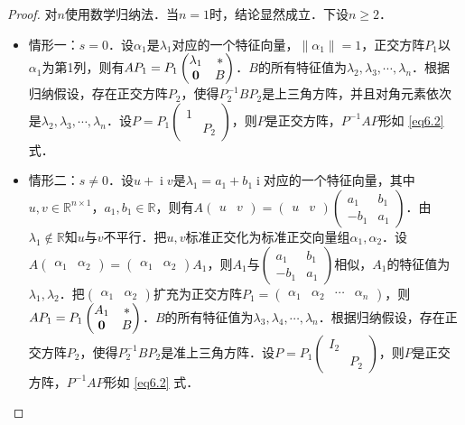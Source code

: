 \documentclass[a4paper,fontset=windows]{ctexbook}
\theoremstyle{definition}
\DeclareMathOperator{\I}{i}
\renewcommand{\ge}{\geqslant}
\begin{document}
\begin{proof}
对$n$使用数学归纳法．当$n=1$时，结论显然成立．下设$n\ge 2$．
\begin{itemize}
\item 情形一：$s=0$．设$\alpha_1$是$\lambda_1$对应的一个特征向量，$\|\alpha_1\|=1$，正交方阵$P_1$以$\alpha_1$为第1列，则有$AP_1=P_1\begin{pmatrix}\lambda_1&* \\ {\bf 0}&B\end{pmatrix}$．$B$的所有特征值为$\lambda_2,\lambda_3,\cdots,\lambda_n$．根据归纳假设，存在正交方阵$P_2$，使得$P_2^{-1}BP_2$是上三角方阵，并且对角元素依次是$\lambda_2,\lambda_3,\cdots,\lambda_n$．设$P=P_1\begin{pmatrix}1& \\ &P_2\end{pmatrix}$，则$P$是正交方阵，$P^{-1}AP$形如 \eqref{eq6.2} 式．

\item 情形二：$s\ne 0$．设$u+\I v$是$\lambda_1=a_1+b_1\I$对应的一个特征向量，其中$u,v\in\mathbb{R}^{n\times 1}$，$a_1,b_1\in\mathbb{R}$，则有$A\begin{pmatrix}u&v\end{pmatrix}=\begin{pmatrix}u&v\end{pmatrix}\begin{pmatrix}a_1&b_1 \\ -b_1&a_1\end{pmatrix}$．由$\lambda_1\notin\mathbb{R}$知$u$与$v$不平行．把$u,v$标准正交化为标准正交向量组$\alpha_1,\alpha_2$．设$A\begin{pmatrix}\alpha_1&\alpha_2\end{pmatrix}=\begin{pmatrix}\alpha_1&\alpha_2\end{pmatrix}A_1$，则$A_1$与$\begin{pmatrix}a_1&b_1 \\ -b_1&a_1\end{pmatrix}$相似，$A_1$的特征值为$\lambda_1,\lambda_2$．把$\begin{pmatrix}\alpha_1&\alpha_2\end{pmatrix}$扩充为正交方阵$P_1=\begin{pmatrix}\alpha_1&\alpha_2&\cdots&\alpha_n\end{pmatrix}$，则$AP_1=P_1\begin{pmatrix}A_1&* \\ {\bf 0}&B\end{pmatrix}$．$B$的所有特征值为$\lambda_3,\lambda_4,\cdots,\lambda_n$．根据归纳假设，存在正交方阵$P_2$，使得$P_2^{-1}BP_2$是准上三角方阵．设$P=P_1\begin{pmatrix}I_2& \\ &P_2\end{pmatrix}$，则$P$是正交方阵，$P^{-1}AP$形如 \eqref{eq6.2} 式．\qedhere
\end{itemize}
\end{proof}
\end{document}
